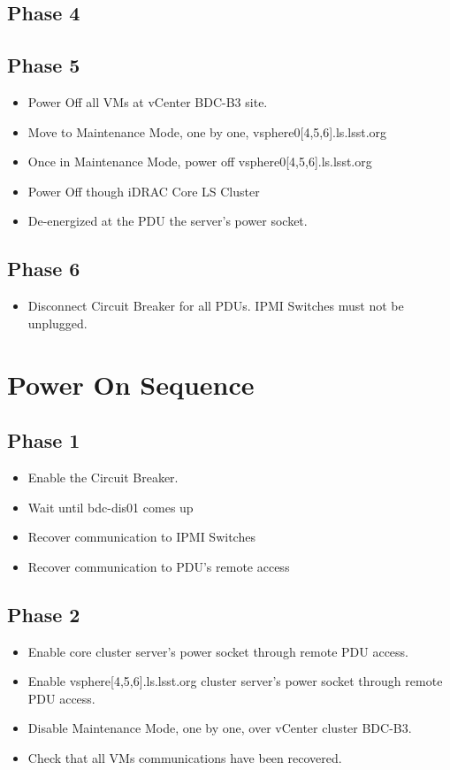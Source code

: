 \newpage
\subsection{Phase 4}

\newpage
\subsection{Phase 5}
\begin{itemize}
  \item Power Off all VMs at vCenter BDC-B3 site.
  \item Move to Maintenance Mode, one by one, vsphere0[4,5,6].ls.lsst.org
  \item Once in Maintenance Mode, power off vsphere0[4,5,6].ls.lsst.org
  \item Power Off though iDRAC Core LS Cluster
  \item De-energized at the PDU the server's power socket.
\end{itemize}

\newpage
\subsection{Phase 6}
\begin{itemize}
  \item Disconnect Circuit Breaker for all PDUs. IPMI Switches must not be unplugged.
\end{itemize}

\newpage
\section{Power On Sequence}
\subsection{Phase 1}
\begin{itemize}
  \item Enable the Circuit Breaker.
  \item Wait until bdc-dis01 comes up
  \item Recover communication to IPMI Switches
  \item Recover communication to PDU's remote access  
\end{itemize}

\newpage
\subsection{Phase 2}
\begin{itemize}
  \item Enable core cluster server's power socket through remote PDU access.
  \item Enable vsphere[4,5,6].ls.lsst.org cluster server's power socket through remote PDU access.
  \item Disable Maintenance Mode, one by one, over vCenter cluster BDC-B3.
  \item Check that all VMs communications have been recovered.
\end{itemize}

